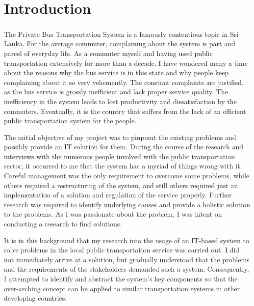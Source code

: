 
\chapter{Introduction}
\label{chapter-Introduction}

\paragraph{ } The Private Bus Transportation System is a famously contentious topic in Sri Lanka. For the average commuter, complaining about the system is part and parcel of everyday life. As a commuter myself and having used public transportation extensively for more than a decade, I have wondered many a time about the reasons why the bus service is in this state and why people keep complaining about it so very vehemently. The constant complaints are justified, as the bus service is grossly inefficient and lack proper service quality. The inefficiency in the system leads to lost productivity and dissatisfaction by the commuters. Eventually, it is the country that suffers from the lack of an efficient public transportation system for the people.

The initial objective of my project was to pinpoint the existing problems and possibly provide an IT solution for them. During the course of the research and interviews with the numerous people involved with the public transportation sector, it occurred to me that the system has a myriad of things wrong with it. Careful management was the only requirement to overcome some problems, while others required a restructuring of the system, and still others required just an implementation of a solution and regulation of the service properly. Further research was required to identify underlying causes and provide a holistic solution to the problems. As I was passionate about the problem, I was intent on conducting a research to find solutions.

It is in this background that my research into the usage of an IT-based system to solve problems in the local public transportation service was carried out. I did not immediately arrive at a solution, but gradually understood that the problems and the requirements of the stakeholders demanded such a system. Consequently, I attempted to identify and abstract the system's key components so that the over-arching concept can be applied to similar transportation systems in other developing countries.

